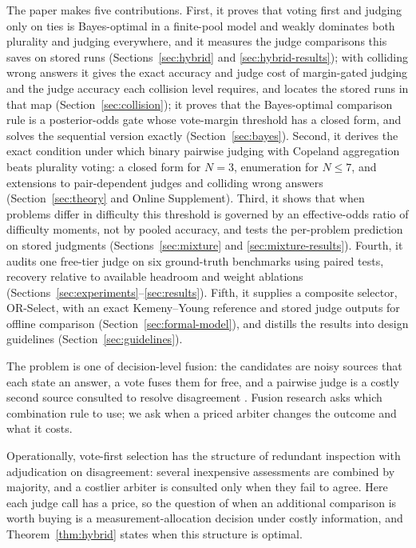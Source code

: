 \documentclass[preprint,11pt,number,sort&compress]{elsarticle}
\begin{document}
The paper makes five contributions. First, it proves that voting first and
judging only on ties is Bayes-optimal in a finite-pool model and weakly
dominates both plurality and judging everywhere, and it measures the judge
comparisons this saves on stored runs (Sections~\ref{sec:hybrid} and
\ref{sec:hybrid-results}); with colliding wrong answers it gives the exact
accuracy and judge cost of margin-gated judging and the judge accuracy each
collision level requires, and locates the stored runs in that map
(Section~\ref{sec:collision}); it proves that the Bayes-optimal comparison rule is a posterior-odds gate whose vote-margin
threshold has a closed form, and solves the sequential version exactly (Section~\ref{sec:bayes}). Second, it derives the exact condition under which
binary pairwise judging with Copeland aggregation beats plurality voting: a
closed form for $N=3$, enumeration for $N\le7$, and extensions to
pair-dependent judges and colliding wrong answers (Section~\ref{sec:theory} and
Online Supplement). Third, it shows that when problems differ in difficulty this
threshold is governed by an effective-odds ratio of difficulty moments, not by
pooled accuracy, and tests the per-problem prediction on stored judgments
(Sections~\ref{sec:mixture} and \ref{sec:mixture-results}). Fourth, it audits
one free-tier judge on six ground-truth benchmarks using paired tests, recovery
relative to available headroom and weight ablations
(Sections~\ref{sec:experiments}--\ref{sec:results}). Fifth, it supplies a composite
selector, OR-Select, with an exact Kemeny--Young reference and stored judge
outputs for offline comparison (Section~\ref{sec:formal-model}), and distills the
results into design guidelines (Section~\ref{sec:guidelines}).

The problem is one of decision-level fusion: the candidates are noisy sources that
each state an answer, a vote fuses them for free, and a pairwise judge is a costly
second source consulted to resolve disagreement \citep{campagner2023aggregation}. Fusion
research asks which combination rule to use; we ask when a priced arbiter changes
the outcome and what it costs.

Operationally, vote-first selection has the structure of redundant inspection
with adjudication on disagreement: several inexpensive assessments are combined
by majority, and a costlier arbiter is consulted only when they fail to agree.
Here each judge call has a price, so the question of when an additional
comparison is worth buying is a measurement-allocation decision under costly
information, and Theorem~\ref{thm:hybrid} states when this structure is optimal.
\end{document}
